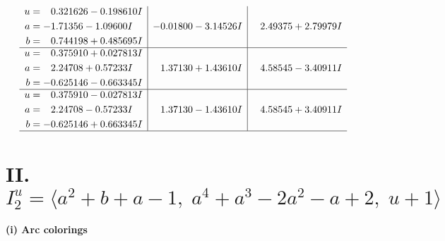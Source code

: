 \documentclass[1p]{elsarticle_modified}
\theoremstyle{definition}
\begin{document}
$$\begin{array}{c|c|c}
\begin{aligned}
u &= \phantom{-}0.321626 - 0.198610 I \\
a &= -1.71356 - 1.09600 I \\
b &= \phantom{-}0.744198 + 0.485695 I\end{aligned}
 & -0.01800 - 3.14526 I & \phantom{-}2.49375 + 2.79979 I \\ \hline\begin{aligned}
u &= \phantom{-}0.375910 + 0.027813 I \\
a &= \phantom{-}2.24708 + 0.57233 I \\
b &= -0.625146 - 0.663345 I\end{aligned}
 & \phantom{-}1.37130 + 1.43610 I & \phantom{-}4.58545 - 3.40911 I \\ \hline\begin{aligned}
u &= \phantom{-}0.375910 - 0.027813 I \\
a &= \phantom{-}2.24708 - 0.57233 I \\
b &= -0.625146 + 0.663345 I\end{aligned}
 & \phantom{-}1.37130 - 1.43610 I & \phantom{-}4.58545 + 3.40911 I\\
 \hline 
 \end{array}$$\newpage\newpage\renewcommand{\arraystretch}{1}
\centering \section*{II. $I^u_{2}= \langle a^2+b+a-1,\;a^4+a^3-2 a^2- a+2,\;u+1 \rangle$}
\flushleft \textbf{(i) Arc colorings}\\
\end{document}
